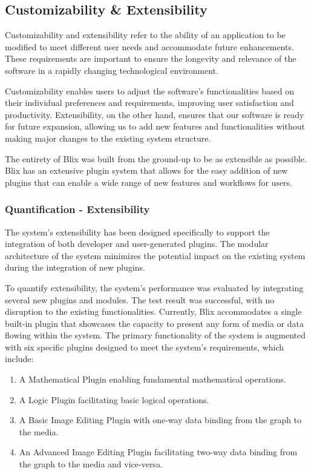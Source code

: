 \documentclass[11pt,a4paper]{article}
\begin{document}
\subsection*{Customizability \& Extensibility}

Customizability and extensibility refer to the ability of an application to be
modified to meet different user needs and accommodate future enhancements. These
requirements are important to ensure the longevity and relevance of the software
in a rapidly changing technological environment.

Customizability enables users to adjust the software's functionalities based on
their individual preferences and requirements, improving user satisfaction and
productivity. Extensibility, on the other hand, ensures that our software is
ready for future expansion, allowing us to add new features and functionalities
without making major changes to the existing system structure.

The entirety of Blix was built from the ground-up to be as extensible as
possible. Blix has an extensive plugin system that allows for the easy addition
of new plugins that can enable a wide range of new features and workflows for
users.  

\subsubsection*{Quantification - Extensibility}

The system's extensibility has been designed specifically to support the
integration of both developer and user-generated plugins. The modular
architecture of the system minimizes the potential impact on the existing system
during the integration of new plugins.

To quantify extensibility, the system's performance was evaluated by integrating
several new plugins and modules. The test result was successful, with no
disruption to the existing functionalities. Currently, Blix accommodates a
single built-in plugin that showcases the capacity to present any form of media
or data flowing within the system. The primary functionality of the system is
augmented with six specific plugins designed to meet the system's requirements,
which include:

\begin{enumerate}
  \item A Mathematical Plugin enabling fundamental mathematical operations. 
  \item A Logic Plugin facilitating basic logical operations.
  \item A Basic Image Editing Plugin with one-way data binding from the graph to
  the media.
  \item An Advanced Image Editing Plugin facilitating two-way data binding from
  the graph to the media and vice-versa.
\end{enumerate}
\end{document}
